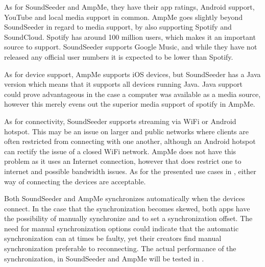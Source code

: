 As for SoundSeeder and AmpMe, they have their app ratings, Android support, YouTube and local media support in common.
AmpMe goes slightly beyond SoundSeeder in regard to media support, by also supporting Spotify and SoundCloud.
Spotify has around 100 million users, which makes it an important source to support\cite{spotify_subscribers}.
SoundSeeder supports Google Music, and while they have not released any official user numbers it is expected to be lower than Spotify\cite{googlem_subscribers}.

As for device support, AmpMe supports iOS devices, but SoundSeeder has a Java version which means that it supports all devices running Java. 
Java support could prove advantageous in the case a computer was available as a media source, however this merely evens out the superior media support of spotify in AmpMe.

As for connectivity, SoundSeeder supports streaming via WiFi or Android hotspot.
This may be an issue on larger and public networks where clients are often restricted from connecting with one another, although an Android hotspot can rectify the issue of a closed WiFi network.
AmpMe does not have this problem as it uses an Internet connection, however that does restrict one to internet and possible bandwidth issues.
As for the presented use cases in , either way of connecting the devices are acceptable.

Both SoundSeeder and AmpMe synchronizes automatically when the devices connect.
In the case that the synchronization becomes skewed, both apps have the possibility of manually synchronize and to set a synchronization offset.
The need for manual synchronization options could indicate that the automatic synchronization can at times be faulty, yet their creators find manual synchronization preferable to reconnecting.
The actual performance of the synchronization, in SoundSeeder and AmpMe will be tested in .

